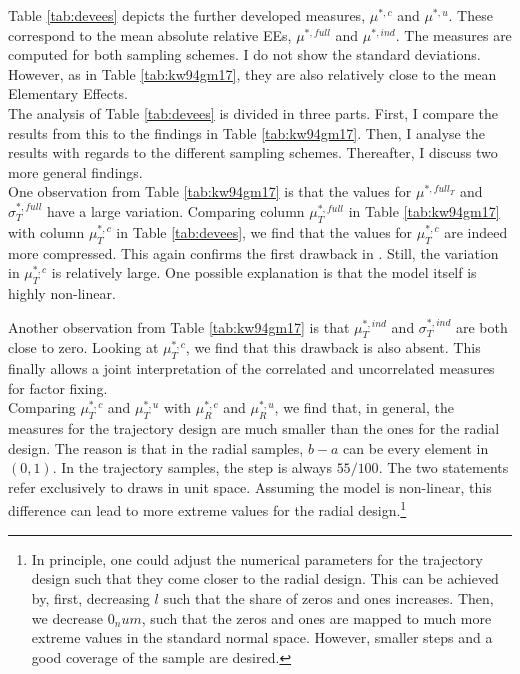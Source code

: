 \noindent
Table \ref{tab:devees} depicts the further developed measures, $\mu^{*,c}$ and $\mu^{*,u}$. These correspond to the mean absolute relative EEs, $\mu^{*,full}$ and $\mu^{*,ind}$. The measures are computed for both sampling schemes. I do not show the standard deviations. However, as in Table \ref{tab:kw94gm17}, they are also relatively close to the mean Elementary Effects.\\

\noindent
The analysis of Table \ref{tab:devees} is divided in three parts. First, I compare the results from this to the findings in Table \ref{tab:kw94gm17}. Then, I analyse the results with regards to the different sampling schemes. Thereafter, I discuss two more general findings.\\

\noindent
One observation from Table \ref{tab:kw94gm17} is that the values for $\mu^{*,full_T}$ and $\sigma^{*,full}_T$ have a large variation. Comparing column $\mu^{*,full}_T$ in Table \ref{tab:kw94gm17} with column $\mu^{*,c}_T$ in Table \ref{tab:devees}, we find that the values for $\mu^{*,c}_T$ are indeed more compressed. This again confirms the first drawback in \cite{ge2017extending}. Still, the variation in $\mu^{*,c}_T$ is relatively large. One possible explanation is that the model itself is highly non-linear.

Another observation from Table \ref{tab:kw94gm17} is that $\mu^{*,ind}_T$ and $\sigma^{*,ind}_T$ are both close to zero. Looking at $\mu^{*,c}_T$, we find that this drawback is also absent. This finally allows a joint interpretation of the correlated and uncorrelated measures for factor fixing.\\

\noindent
Comparing $\mu^{*,c}_T$ and $\mu^{*,u}_T$ with $\mu^{*,c}_R$ and $\mu^{*,u}_R$, we find that, in general, the measures for the trajectory design are much smaller than the ones for the radial design. The reason is that in the radial samples, $b-a$ can be every element in $(0,1)$. In the trajectory samples, the step is always $55/100$. The two statements refer exclusively to draws in unit space. Assuming the model is non-linear, this difference can lead to more extreme values for the radial design.\footnote{In principle, one could adjust the numerical parameters for the trajectory design such that they come closer to the radial design. This can be achieved by, first, decreasing $l$ such that the share of zeros and ones increases. Then, we decrease $0_num$, such that the zeros and ones are mapped to much more extreme values in the standard normal space. However, smaller steps and a good coverage of the sample are desired.}\\

